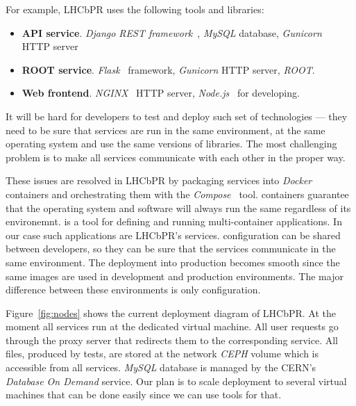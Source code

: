 \documentclass[a4paper]{jpconf}
\begin{document}
For example, LHCbPR uses the following tools and libraries:
\begin{itemize}
\item \textbf{API service}. \textit{Django REST framework}~\cite{rest}, \textit{MySQL}
database, \textit{Gunicorn}~\cite{gunicorn} HTTP server
\item \textbf{ROOT service}. \textit{Flask}~\cite{flask} framework, \textit{Gunicorn} HTTP server, \textit{ROOT}.
\item \textbf{Web frontend}. \textit{NGINX}~\cite{nginx} HTTP server, \textit{Node.js}~\cite{node} for developing.
\end{itemize}

It will be hard for developers to test and deploy  such set of technologies
--- they need to be sure that services are run in the same environment, at
the same operating system and use the same versions of libraries. The most
challenging problem is to make all services communicate with each other in the proper way.

These issues are resolved in LHCbPR by packaging services into
\textit{Docker~\cite{docker}} containers and orchestrating them with the \docker
\textit{Compose~\cite{compose}} tool. \docker containers guarantee that the
operating system and software will always run the same regardless of its
environemnt. \compose is a tool for defining and running multi-container \docker
applications. In our case such applications are LHCbPR's services. \composes
configuration can be shared between developers, so they can be sure that the
services communicate in the same environment. The deployment into production
becomes  smooth since the same
\docker images are used in development and production environments. The major difference
 between these environments is only \composes configuration.

Figure~\ref{fig:nodes} shows the current deployment diagram of LHCbPR. At the
moment all services run at the dedicated virtual machine. All user requests go
through the proxy server that redirects them to the corresponding service. All
files, produced by tests, are stored at the network \textit{CEPH} volume which
is accessible from all services.
\textit{MySQL} database is managed by the CERN's \textit{Database On Demand}
service. Our plan is  to scale deployment to several virtual machines that can
be done easily since we can use \docker tools for that.  
\end{document}
